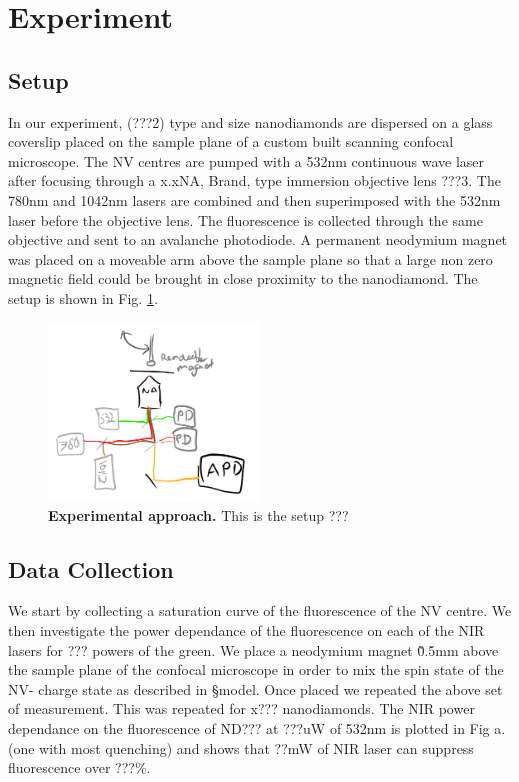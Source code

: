 \documentclass[preprint,prl]{revtex4}
\begin{document}
\section{Experiment}
\subsection{Setup}
In our experiment, (???2) type and size nanodiamonds are dispersed on a glass coverslip placed on the sample plane of a custom built scanning confocal microscope. The NV centres are pumped with a 532nm continuous wave laser after focusing through a x.xNA, Brand, type immersion objective lens ???3. The 780nm and 1042nm lasers are combined and then superimposed with the 532nm laser before the objective lens. The fluorescence is collected through the same objective and sent to an avalanche photodiode. A permanent neodymium magnet was placed on a moveable arm above the sample plane so that a large non zero magnetic field could be brought in close proximity to the nanodiamond. The setup is shown in Fig. \ref{FigSetup}.

\begin{figure}[t]
  \centering
  \includegraphics[width=0.5\textwidth]{Setup.png} 
 \caption{\textbf{Experimental approach.} This is the setup ???} \label{FigSetup}
\end{figure}

\subsection{Data Collection}
We start by collecting a saturation curve of the fluorescence of the NV centre. We then investigate the power dependance of the fluorescence on each of the NIR lasers for ??? powers of the green. We place a neodymium magnet \~0.5mm above the sample plane of the confocal microscope in order to mix the spin state of the NV- charge state as described in \S model. Once placed we repeated the above set of measurement. This was repeated for x??? nanodiamonds. The NIR power dependance on the fluorescence of ND??? at ???uW of 532nm is plotted in Fig a. (one with most quenching) and shows that ??mW of NIR laser can suppress fluorescence over ???\%.
\end{document}
